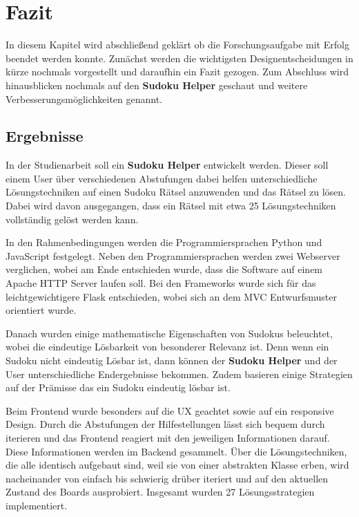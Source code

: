 
\chapter{Fazit}

In diesem Kapitel wird abschließend geklärt ob die Forschungsaufgabe mit Erfolg beendet werden konnte. Zunächst werden die wichtigsten Designentscheidungen in kürze nochmals vorgestellt und daraufhin ein Fazit gezogen. Zum Abschluss wird hinausblicken nochmals auf den \textbf{Sudoku Helper} geschaut und weitere Verbesserungsmöglichkeiten genannt. 

\section{Ergebnisse}

In der Studienarbeit soll ein \textbf{Sudoku Helper} entwickelt werden. Dieser soll einem User über verschiedenen Abstufungen dabei helfen unterschiedliche Lösungstechniken auf einen Sudoku Rätsel anzuwenden und das Rätsel zu lösen. Dabei wird davon ausgegangen, dass ein Rätsel mit etwa 25 Lösungstechniken vollständig gelöst werden kann. 

In den Rahmenbedingungen werden die Programmiersprachen Python und JavaScript festgelegt. Neben den Programmiersprachen werden zwei Webserver verglichen, wobei am Ende entschieden wurde, dass die Software auf einem Apache \Ac{HTTP} Server laufen soll. Bei den Frameworks wurde sich für das leichtgewichtigere Flask entschieden, wobei sich an dem \ac{MVC} Entwurfsmuster orientiert wurde.

Danach wurden einige mathematische Eigenschaften von Sudokus beleuchtet, wobei die eindeutige Lösbarkeit von besonderer Relevanz ist. Denn wenn ein Sudoku nicht eindeutig Lösbar ist, dann können der \textbf{Sudoku Helper} und der User unterschiedliche Endergebnisse bekommen. Zudem basieren einige Strategien auf der Prämisse das ein Sudoku eindeutig lösbar ist.

Beim Frontend wurde besonders auf die \ac{UX} geachtet sowie auf ein responsive Design. Durch die Abstufungen der Hilfestellungen lässt sich bequem durch iterieren und das Frontend reagiert mit den jeweiligen Informationen darauf. Diese Informationen werden im Backend gesammelt. Über die Lösungstechniken, die alle identisch aufgebaut sind, weil sie von einer abstrakten Klasse erben, wird nacheinander von einfach bis schwierig drüber iteriert und auf den aktuellen Zustand des Boards ausprobiert. Insgesamt wurden 27 Lösungsstrategien implementiert.


